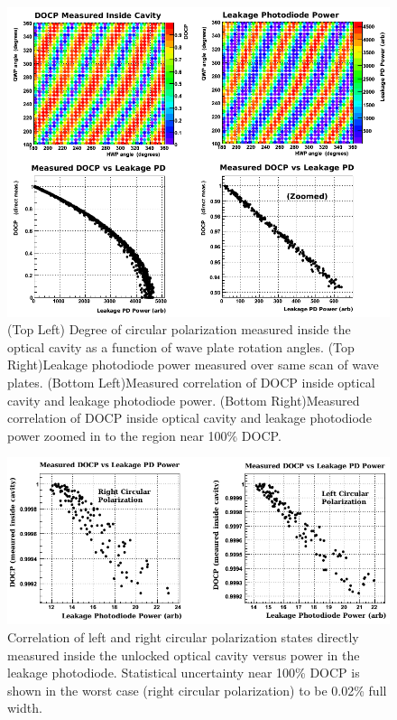 \begin{figure}[ht]
\centering
\includegraphics[width=5.6in]{./Pictures/Measured_DOCP_correlation.png}
\caption{\label{fig:DOCP_measured_correl}(Top Left) Degree of circular polarization measured inside the optical cavity as a function of wave plate rotation angles. (Top Right)Leakage photodiode power measured over same scan of wave plates. (Bottom Left)Measured correlation of DOCP inside optical cavity and leakage photodiode power. (Bottom Right)Measured correlation of DOCP inside optical cavity and leakage photodiode power zoomed in to the region near 100\% DOCP.}

\end{figure}
\begin{figure}[ht]
\begin{center}
\includegraphics[width=5.9in]{./Pictures/zoomed_correl.png}
\caption{\label{fig:landr_docp_correl}Correlation of left and right circular polarization states directly measured inside the unlocked optical cavity versus power in the leakage photodiode. Statistical uncertainty near 100\% DOCP is shown in the worst case (right circular polarization) to be 0.02\% full width.}
\end{center}
\end{figure}
 
